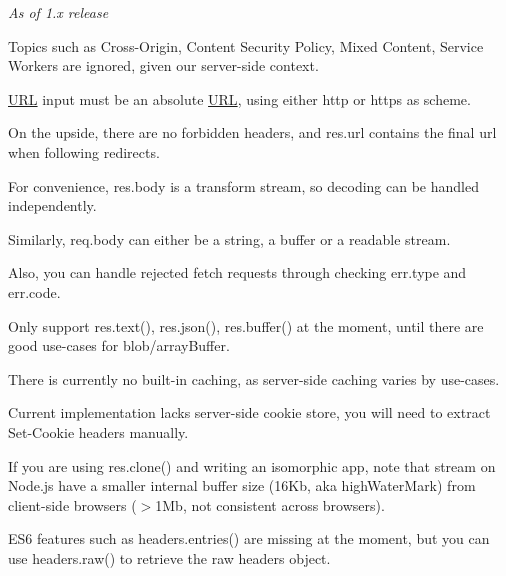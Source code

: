 {\itshape As of 1.\+x release}


\begin{DoxyItemize}
\item Topics such as Cross-\/\+Origin, Content Security Policy, Mixed Content, Service Workers are ignored, given our server-\/side context.
\item \mbox{\hyperlink{namespace_u_r_l}{U\+RL}} input must be an absolute \mbox{\hyperlink{namespace_u_r_l}{U\+RL}}, using either {\ttfamily http} or {\ttfamily https} as scheme.
\item On the upside, there are no forbidden headers, and {\ttfamily res.\+url} contains the final url when following redirects.
\item For convenience, {\ttfamily res.\+body} is a transform stream, so decoding can be handled independently.
\item Similarly, {\ttfamily req.\+body} can either be a string, a buffer or a readable stream.
\item Also, you can handle rejected fetch requests through checking {\ttfamily err.\+type} and {\ttfamily err.\+code}.
\item Only support {\ttfamily res.\+text()}, {\ttfamily res.\+json()}, {\ttfamily res.\+buffer()} at the moment, until there are good use-\/cases for blob/array\+Buffer.
\item There is currently no built-\/in caching, as server-\/side caching varies by use-\/cases.
\item Current implementation lacks server-\/side cookie store, you will need to extract {\ttfamily Set-\/\+Cookie} headers manually.
\item If you are using {\ttfamily res.\+clone()} and writing an isomorphic app, note that stream on Node.\+js have a smaller internal buffer size (16\+Kb, aka {\ttfamily high\+Water\+Mark}) from client-\/side browsers ($>$1\+Mb, not consistent across browsers).
\item E\+S6 features such as {\ttfamily headers.\+entries()} are missing at the moment, but you can use {\ttfamily headers.\+raw()} to retrieve the raw headers object. 
\end{DoxyItemize}